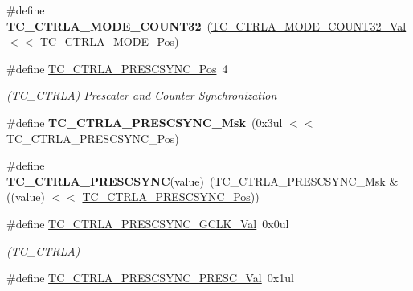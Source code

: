 \begin{DoxyCompactItemize}
\item 
\hypertarget{group___s_a_m_l21___t_c_gaafd0a2639ddfff12e2d493182da59b8c}{}\#define {\bfseries T\+C\+\_\+\+C\+T\+R\+L\+A\+\_\+\+M\+O\+D\+E\+\_\+\+C\+O\+U\+N\+T32}~(\hyperlink{group___s_a_m_l21___t_c_gac7e348d6c5100444a6b538d20b420c8c}{T\+C\+\_\+\+C\+T\+R\+L\+A\+\_\+\+M\+O\+D\+E\+\_\+\+C\+O\+U\+N\+T32\+\_\+\+Val}     $<$$<$ \hyperlink{group___s_a_m_l21___t_c_gaae33620c144befdc20a57898c2d5bb96}{T\+C\+\_\+\+C\+T\+R\+L\+A\+\_\+\+M\+O\+D\+E\+\_\+\+Pos})\label{group___s_a_m_l21___t_c_gaafd0a2639ddfff12e2d493182da59b8c}

\item 
\hypertarget{group___s_a_m_l21___t_c_ga9791c4a6d8cb12aa2b14d4fce3653c70}{}\#define \hyperlink{group___s_a_m_l21___t_c_ga9791c4a6d8cb12aa2b14d4fce3653c70}{T\+C\+\_\+\+C\+T\+R\+L\+A\+\_\+\+P\+R\+E\+S\+C\+S\+Y\+N\+C\+\_\+\+Pos}~4\label{group___s_a_m_l21___t_c_ga9791c4a6d8cb12aa2b14d4fce3653c70}

\begin{DoxyCompactList}\small\item\em (T\+C\+\_\+\+C\+T\+R\+L\+A) Prescaler and Counter Synchronization \end{DoxyCompactList}\item 
\hypertarget{group___s_a_m_l21___t_c_gaa9b306e6e125ff09abc537de1182de12}{}\#define {\bfseries T\+C\+\_\+\+C\+T\+R\+L\+A\+\_\+\+P\+R\+E\+S\+C\+S\+Y\+N\+C\+\_\+\+Msk}~(0x3ul $<$$<$ T\+C\+\_\+\+C\+T\+R\+L\+A\+\_\+\+P\+R\+E\+S\+C\+S\+Y\+N\+C\+\_\+\+Pos)\label{group___s_a_m_l21___t_c_gaa9b306e6e125ff09abc537de1182de12}

\item 
\hypertarget{group___s_a_m_l21___t_c_gac25421ed7d084799e2305594f9225bee}{}\#define {\bfseries T\+C\+\_\+\+C\+T\+R\+L\+A\+\_\+\+P\+R\+E\+S\+C\+S\+Y\+N\+C}(value)~(T\+C\+\_\+\+C\+T\+R\+L\+A\+\_\+\+P\+R\+E\+S\+C\+S\+Y\+N\+C\+\_\+\+Msk \& ((value) $<$$<$ \hyperlink{group___s_a_m_l21___t_c_ga9791c4a6d8cb12aa2b14d4fce3653c70}{T\+C\+\_\+\+C\+T\+R\+L\+A\+\_\+\+P\+R\+E\+S\+C\+S\+Y\+N\+C\+\_\+\+Pos}))\label{group___s_a_m_l21___t_c_gac25421ed7d084799e2305594f9225bee}

\item 
\hypertarget{group___s_a_m_l21___t_c_gafe7113a1b787ad78681b2eafb2af17ad}{}\#define \hyperlink{group___s_a_m_l21___t_c_gafe7113a1b787ad78681b2eafb2af17ad}{T\+C\+\_\+\+C\+T\+R\+L\+A\+\_\+\+P\+R\+E\+S\+C\+S\+Y\+N\+C\+\_\+\+G\+C\+L\+K\+\_\+\+Val}~0x0ul\label{group___s_a_m_l21___t_c_gafe7113a1b787ad78681b2eafb2af17ad}

\begin{DoxyCompactList}\small\item\em (T\+C\+\_\+\+C\+T\+R\+L\+A) \end{DoxyCompactList}\item 
\hypertarget{group___s_a_m_l21___t_c_ga624a051941bebc564f66db4b57927925}{}\#define \hyperlink{group___s_a_m_l21___t_c_ga624a051941bebc564f66db4b57927925}{T\+C\+\_\+\+C\+T\+R\+L\+A\+\_\+\+P\+R\+E\+S\+C\+S\+Y\+N\+C\+\_\+\+P\+R\+E\+S\+C\+\_\+\+Val}~0x1ul\label{group___s_a_m_l21___t_c_ga624a051941bebc564f66db4b57927925}


\end{DoxyCompactItemize}
